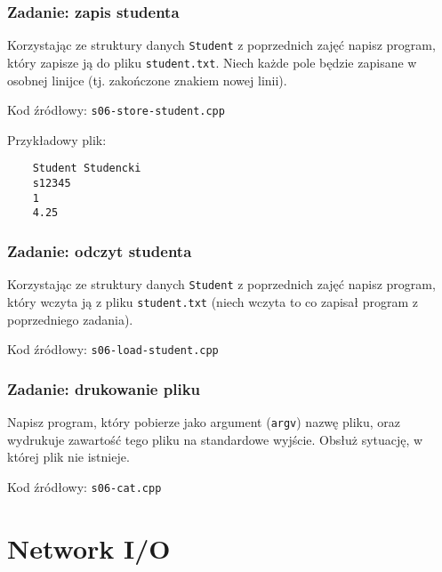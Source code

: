 \documentclass[aspectratio=169]{beamer}
\begin{document}
\begin{frame}[fragile]
    \frametitle{Zadanie: zapis studenta}
    \label{lecture_exercise_0}

    Korzystając ze struktury danych \texttt{Student} z poprzednich zajęć napisz
    program, który zapisze ją do pliku \texttt{student.txt}. Niech każde pole
    będzie zapisane w osobnej linijce (tj. zakończone znakiem nowej linii).

    Kod źródłowy: \texttt{s06-store-student.cpp}

    \vspace{1em}

    Przykładowy plik:
    {\small
    \begin{lstlisting}
    Student Studencki
    s12345
    1
    4.25
    \end{lstlisting}}
\end{frame}

\begin{frame}
    \frametitle{Zadanie: odczyt studenta}
    \label{lecture_exercise_1}

    Korzystając ze struktury danych \texttt{Student} z poprzednich zajęć napisz
    program, który wczyta ją z pliku \texttt{student.txt} (niech wczyta to co
    zapisał program z poprzedniego zadania).

    Kod źródłowy: \texttt{s06-load-student.cpp}
\end{frame}

\begin{frame}
    \frametitle{Zadanie: drukowanie pliku}
    \label{lecture_exercise_2}

    Napisz program, który pobierze jako argument (\texttt{argv}) nazwę pliku,
    oraz wydrukuje zawartość tego pliku na standardowe wyjście. Obsłuż sytuację,
    w której plik nie istnieje.

    Kod źródłowy: \texttt{s06-cat.cpp}
\end{frame}

\section{Network I/O}
\end{document}
